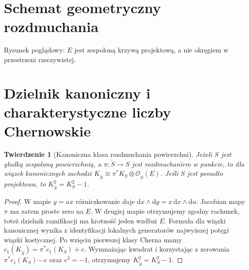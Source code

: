 \documentclass[11pt,a4paper,oneside]{report}
\newcommand{\dd}{\mathrm d}
\theoremstyle{plain}
\newtheorem{twierdzenie}{Twierdzenie}[section]
\theoremstyle{definition}
\theoremstyle{remark}
\begin{document}
\section{Schemat geometryczny rozdmuchania}
\begin{center}
\par\smallskip\small Rysunek poglądowy: $E$ jest zespoloną krzywą projektową,
a nie okręgiem w przestrzeni rzeczywistej.
\end{center}

\section{Dzielnik kanoniczny i charakterystyczne liczby Chernowskie}
\begin{twierdzenie}[Kanoniczna klasa rozdmuchania powierzchni]
\label{thm:xvii-canonical}
Jeżeli $S$ jest gładką zespoloną powierzchnią,
a $\pi:\widetilde S\to S$ jest rozdmuchaniem w punkcie,
to dla wiązek kanonicznych zachodzi
$K_{\widetilde S}\cong\pi^*K_S\otimes\mathcal O_{\widetilde S}(E)$.
Jeśli $S$ jest ponadto projektowa, to
$K_{\widetilde S}^2=K_S^2-1$.
\end{twierdzenie}
\begin{proof}
W mapie $y=ux$ różniczkowanie daje
$\dd x\wedge\dd y=x\,\dd x\wedge\dd u$.
Jacobian mapy $\pi$ ma zatem proste zero na $E$.
W drugiej mapie otrzymujemy zgodny rachunek, toteż
dzielnik ramifikacji ma krotność jeden wzdłuż $E$.
Formuła dla wiązki kanonicznej wynika z identyfikacji
lokalnych generatorów najwyższej potęgi wiązki kostycznej.
Po wzięciu pierwszej klasy Cherna mamy
$c_1(K_{\widetilde S})=\pi^*c_1(K_S)+e$.
Wymnażając kwadrat i korzystając z zerowania
$\pi^*c_1(K_S)\smile e$ oraz $e^2=-1$,
otrzymujemy $K_{\widetilde S}^2=K_S^2-1$.
\end{proof}
\end{document}
